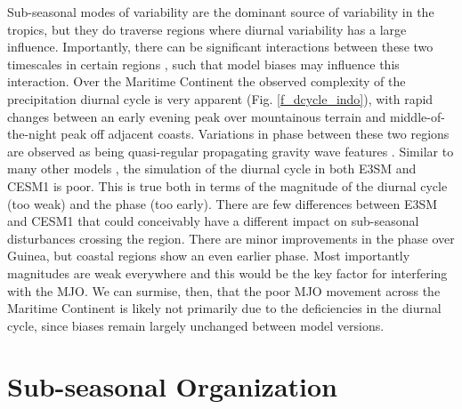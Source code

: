 \documentclass[draft,ms]{AGUTeX}
\begin{document}
\begin{article}
Sub-seasonal modes of variability are the dominant source of variability in the tropics, but they do traverse regions where diurnal variability has a large influence. Importantly, there can be significant interactions between these two timescales in certain regions \citep[e.g., ][]{Rauniyar2011}, such that model biases may influence this interaction. Over the Maritime Continent the observed complexity of the precipitation diurnal cycle is very apparent (Fig. \ref{f_dcycle_indo}), with rapid changes between an early evening peak over mountainous terrain and middle-of-the-night peak off adjacent coasts. Variations in phase between these two regions are observed as being quasi-regular propagating gravity wave features \citep{Mori2004}. Similar to many other models \citep{Dirmeyer2012}, the simulation of the diurnal cycle in both E3SM and CESM1 is poor. This is true both in terms of the magnitude of the diurnal cycle (too weak) and the phase (too early). There are few differences between E3SM and CESM1 that could conceivably have a different impact on sub-seasonal disturbances crossing the region. There are minor improvements in the phase over Guinea, but coastal regions show an even earlier phase. Most importantly magnitudes are weak everywhere and this would be the key factor for interfering with the MJO. We can surmise, then, that the poor MJO movement across the Maritime Continent is likely not primarily due to the deficiencies in the diurnal cycle, since biases remain largely unchanged between model versions.




\section{Sub-seasonal Organization}
\label{sec:waves}


\end{article}
\end{document}
